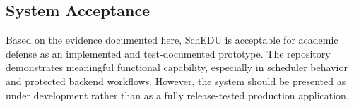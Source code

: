 \documentclass[12pt]{article}
\begin{document}
\subsection{System Acceptance}

Based on the evidence documented here, SchEDU is acceptable for academic defense as an implemented and test-documented prototype. The repository demonstrates meaningful functional capability, especially in scheduler behavior and protected backend workflows. However, the system should be presented as under development rather than as a fully release-tested production application.
\end{document}
